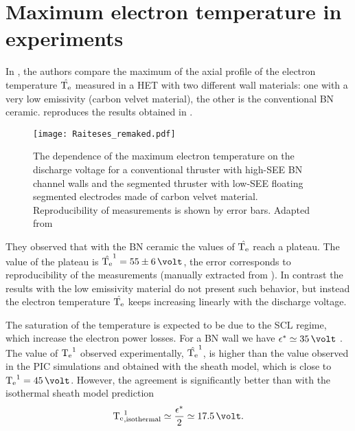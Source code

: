 

    
    \section{Maximum electron temperature in experiments}
    
    
    In \citet{raitses2006}, the authors compare the maximum of the axial profile of the electron temperature $\hat{\mathrm{T_e}}$ measured in a \ac{HET} with two different wall materials\string: one with a very low emissivity (carbon velvet material), the other is the conventional \ac{BN} ceramic.
     reproduces the results obtained in \citet{raitses2006}.

    \begin{figure}[hbt]
      \centering
      \texttt{[image: Raiteses\_remaked.pdf]}
      \caption{ The dependence of the maximum electron temperature on the discharge  voltage for a conventional thruster with high-SEE \acs{BN} channel walls and the segmented thruster with low-SEE floating segmented electrodes made of carbon velvet material. Reproducibility of measurements is shown by error bars. Adapted from \citet[Fig. 3]{raitses2006} }
      \label{fig-raiteses2006}
    \end{figure}

    They observed that with the \ac{BN} ceramic the values of $\hat{\mathrm{T_e}}$ reach a plateau.
    The value of the plateau is $\hat{\Te}^1 = 55 \pm 6\,\volt$, the error corresponds to reproducibility of the measurements (manually extracted from \citep[Fig. 3]{raitses2006}).
    In contrast the results with the low emissivity material do not present such behavior, but instead the electron temperature $\hat{\mathrm{T_e}}$ keeps increasing linearly with the discharge voltage.
    
    The saturation of the temperature is expected to be due to the \ac{SCL} regime, which increase the electron power losses.
    For a \ac{BN} wall we have $\crover \simeq 35\,\volt$ \citep{smirnov2004}.
    The value of $\mathrm{T_e}^1$ observed experimentally,  $\hat{\mathrm{T_e}}^1$, is higher than the value observed in the \ac{PIC} simulations and obtained with the sheath model, which is close to $\Te^1 = 45\,\volt$.
    However, the agreement is significantly better than with the isothermal sheath model prediction 
    \begin{equation} \label{eq-Temaxisothermal}
      \Te^1_{\rm , isothermal} \simeq \frac{\crover}{2} \simeq 17.5 \,\volt.
    \end{equation}
    
    